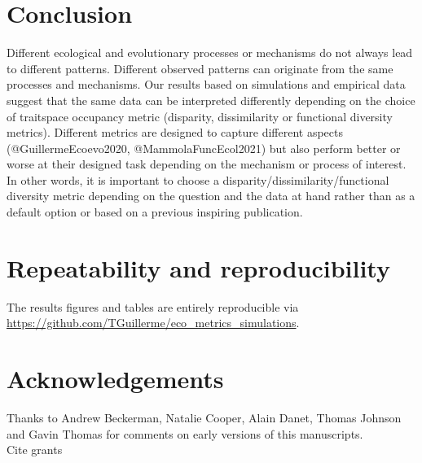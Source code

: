 \documentclass[12pt,letterpaper]{article}
\begin{document}
\section{Conclusion}
Different ecological and evolutionary processes or mechanisms do not always lead to different patterns.
Different observed patterns can originate from the same processes and mechanisms.
Our results based on simulations and empirical data suggest that the same data can be interpreted differently depending on the choice of traitspace occupancy metric (disparity, dissimilarity or functional diversity metrics).
Different metrics are designed to capture different aspects (@GuillermeEcoevo2020, @MammolaFuncEcol2021) but also perform better or worse at their designed task depending on the mechanism or process of interest.
In other words, it is important to choose a disparity/dissimilarity/functional diversity metric depending on the question and the data at hand rather than as a default option or based on a previous inspiring publication.

\section{Repeatability and reproducibility}
The results figures and tables are entirely reproducible via \url{https://github.com/TGuillerme/eco_metrics_simulations}.


\section{Acknowledgements}
Thanks to Andrew Beckerman, Natalie Cooper, Alain Danet, Thomas Johnson and Gavin Thomas for comments on early versions of this manuscripts.\\
Cite grants


% 

\end{document}
